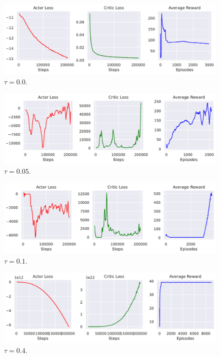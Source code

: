 \begin{figure}[ht]
  \centering
  \includegraphics[width=\linewidth]{images/exp-hopper-tau0.0.pdf}
  \caption{$\tau = 0.0$.}
\end{figure}

\begin{figure}[ht]
  \centering
  \includegraphics[width=\linewidth]{images/exp-hopper-tau0.05.pdf}
  \caption{$\tau = 0.05$.}
\end{figure}

\begin{figure}[ht]
  \centering
  \includegraphics[width=\linewidth]{images/exp-hopper-tau0.1.pdf}
  \caption{$\tau = 0.1$.}
   \label{fig:boom}
\end{figure}

\begin{figure}[ht]
  \centering
  \includegraphics[width=\linewidth]{images/exp-hopper-tau0.4.pdf}
  \caption{$\tau = 0.4$.}
\end{figure}

